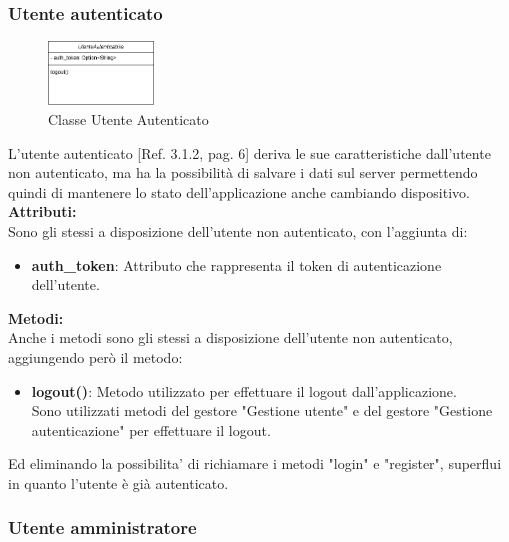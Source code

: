 \documentclass{article}
\begin{document}
\subsubsection{Utente autenticato}

\begin{figure}[htbp]
    \centering
    \includegraphics[width=0.25\textwidth]{Images/utenteAut_class.png}
    \caption{Classe Utente Autenticato}
    \label{fig:utente_autenticato}
\end{figure}

L'utente autenticato [Ref. 3.1.2, pag. 6] deriva le sue caratteristiche dall'utente non autenticato, ma ha la possibilità di salvare i dati sul server permettendo quindi di mantenere lo stato dell'applicazione anche cambiando dispositivo.\\

\textbf{Attributi:}\\
Sono gli stessi a disposizione dell'utente non autenticato, con l'aggiunta di:
\begin{itemize}
    \item \textbf{auth\_token}: Attributo che rappresenta il token di autenticazione dell'utente.
\end{itemize}

\textbf{Metodi:}\\
Anche i metodi sono gli stessi a disposizione dell'utente non autenticato, aggiungendo però il metodo:
\begin{itemize}
    \item \textbf{logout()}: Metodo utilizzato per effettuare il logout dall'applicazione.\\Sono utilizzati metodi del gestore "Gestione utente" e del gestore "Gestione autenticazione" per effettuare il logout.
\end{itemize}
Ed eliminando la possibilita' di richiamare i metodi "login" e "register", superflui in quanto l'utente è già autenticato.

\clearpage

\subsubsection{Utente amministratore}
\end{document}
